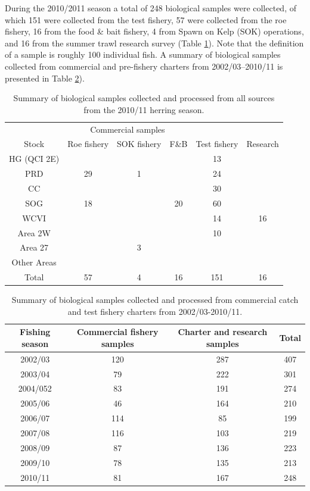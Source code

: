 	During the 2010/2011 season a total of 248 biological samples were collected, of which 151 were collected from the test fishery, 57 were collected from the roe fishery, 16 from the food \& bait fishery, 4 from Spawn on Kelp (SOK) operations, and 16 from the summer trawl research survey (Table \ref{table:PartII:bioSamples}).  Note that the definition of a sample is roughly 100 individual fish.  A summary of biological samples collected from commercial and pre-fishery charters from 2002/03--2010/11 is presented in Table \ref{table:PartII:sampleSizes}).

\begin{table}
	\caption{Summary of biological samples collected and processed from all sources from the 2010/11 herring season.}
	\label{table:PartII:bioSamples}
	\begin{center}
		\begin{tabular}{cccccc}
		\hline
		& \multicolumn{3}{c}{Commercial samples} &  \\
		Stock & Roe fishery & SOK fishery & F\&B & Test fishery & Research\\
		\hline
		HG (QCI 2E) &  &  &  & 13\\
		PRD & 29 & 1 &  & 24\\
		CC &  &  &  & 30\\
		SOG & 18 &  & 20 & 60\\
		WCVI &  &  &  & 14 & 16\\
		Area 2W &  &  &  & 10\\
		Area 27 &  & 3\\
		Other Areas\\
		\hline
		Total & 57 & 4 & 16 & 151 & 16\\
		\hline
		\end{tabular}
	\end{center}
\end{table}

\begin{table}
	\caption{Summary of biological samples collected and processed from commercial catch and test fishery charters from 2002/03-2010/11.}
	\label{table:PartII:sampleSizes}
	\begin{center}
\begin{tabular}{cccc}
\hline
Fishing season & Commercial fishery samples & Charter and research samples & Total\\
\hline
2002/03 & 120 & 287 & 407\\
2003/04 & 79 & 222 & 301\\
2004/052 & 83 & 191 & 274\\
2005/06 & 46 & 164 & 210\\
2006/07 & 114 & 85 & 199\\
2007/08 & 116 & 103 & 219\\
2008/09 & 87 & 136 & 223\\
2009/10 & 78 & 135 & 213\\
2010/11 & 81 & 167 & 248\\
\hline
\end{tabular}
	
	\end{center}
\end{table}
	
